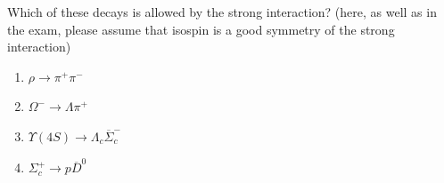 Which of these decays is allowed by the strong interaction?
(here, as well as in the exam, please assume that isospin is a good symmetry of the strong interaction)
\begin{enumerate}
  \item $\rho \to \pi^+ \pi^-$
  \item $\Omega^- \to \Lambda \pi^+$
  \item $\Upsilon(4S) \to \Lambda_c \overline{\Sigma}_c^-$
  \item $\Sigma_c^+ \to p \overline{D}^0$
\end{enumerate}




